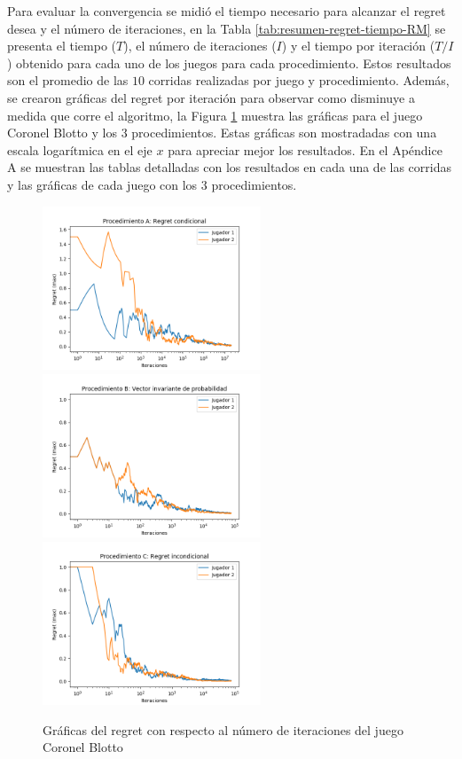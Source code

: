 Para evaluar la convergencia se midió el tiempo necesario para alcanzar el regret desea y el número de iteraciones, en la Tabla \ref{tab:resumen-regret-tiempo-RM} se presenta el tiempo ($T$), el número de iteraciones ($I$) y el tiempo por iteración ($T/I$) obtenido para cada uno de los juegos para cada procedimiento. Estos resultados son el promedio de las $10$ corridas realizadas por juego y procedimiento. Además, se crearon gráficas del regret por iteración para observar como disminuye a medida que corre el algoritmo, la  Figura  \ref{fig:regret-blotto} muestra las gráficas para el juego Coronel Blotto y los $3$ procedimientos. Estas gráficas son mostradadas con una escala logarítmica en el eje $x$ para apreciar mejor los resultados. En el Apéndice A se muestran las tablas detalladas con los resultados en cada una de las corridas y las gráficas de cada juego con los $3$ procedimientos.

\begin{figure}[htpb!]
    \caption{Gráficas del regret con respecto al número de iteraciones del juego Coronel Blotto}
    \label{fig:regret-blotto}
    \centering
    \includegraphics[width=0.58\textwidth]{graficas/coronel-blotto/procedimiento-A.png}
    \includegraphics[width=0.58\textwidth]{graficas/coronel-blotto/procedimiento-B.png}
    \includegraphics[width=0.58\textwidth]{graficas/coronel-blotto/procedimiento-C.png}
\end{figure}


